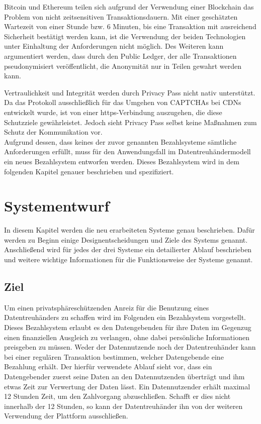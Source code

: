 \documentclass[
	fontsize=12pt,
	headings=small,
	parskip=half,           %
	bibliography=totoc,
	numbers=noenddot,       %
	open=any,               %
]{scrreprt}
\begin{document}
Bitcoin und Ethereum teilen sich aufgrund der Verwendung einer Blockchain das Problem von nicht zeitsensitiven Transaktionsdauern. Mit einer geschätzten Wartezeit von einer Stunde bzw. 6 Minuten, bis eine Transaktion mit ausreichend Sicherheit bestätigt werden kann, ist die Verwendung der beiden Technologien unter Einhaltung der Anforderungen nicht möglich. Des Weiteren kann argumentiert werden, dass durch den Public Ledger, der alle Transaktionen pseudonymisiert veröffentlicht, die Anonymität nur in Teilen gewahrt werden kann. 

Vertraulichkeit und Integrität werden durch Privacy Pass nicht nativ unterstützt. Da das Protokoll ausschließlich für das Umgehen von CAPTCHAs bei CDNs entwickelt wurde, ist von einer https-Verbindung auszugehen, die diese Schutzziele gewährleistet. Jedoch sieht Privacy Pass selbst keine Maßnahmen zum Schutz der Kommunikation vor.\\

Aufgrund dessen, dass keines der zuvor genannten Bezahlsysteme sämtliche Anforderungen erfüllt, muss für den Anwendungsfall im Datentreuhändermodell ein neues Bezahlsystem entworfen werden. Dieses Bezahlsystem wird in dem folgenden Kapitel genauer beschrieben und spezifiziert. 





\chapter{Systementwurf}
\label{chap:systems}

In diesem Kapitel werden die neu erarbeiteten Systeme genau beschrieben. Dafür werden zu Beginn einige Designentscheidungen und Ziele des Systems genannt. Anschließend wird für jedes der drei Systeme ein detailierter Ablauf beschrieben und weitere wichtige Informationen für die Funktionsweise der Systeme genannt.

\section{Ziel}
\label{sec:mainPart_ziel}
Um einen privatsphäreschützenden Anreiz für die Benutzung eines Datentreuhänders zu schaffen wird im Folgenden ein Bezahlsystem vorgestellt. Dieses Bezahlsystem erlaubt es den Datengebenden für ihre Daten im Gegenzug einen finanziellen Ausgleich zu verlangen, ohne dabei persönliche Informationen preisgeben zu müssen. Weder der Datennutzende noch der Datentreuhänder kann bei einer regulären Transaktion bestimmen, welcher Datengebende eine Bezahlung erhält. Der hierfür verwendete Ablauf sieht vor, dass ein Datengebender zuerst seine Daten an den Datennutzenden überträgt und ihm etwas Zeit zur Verwertung der Daten lässt. Ein Datennutzender erhält maximal 12 Stunden Zeit, um den Zahlvorgang abzuschließen. Schafft er dies nicht innerhalb der 12 Stunden, so kann der Datentreuhänder ihn von der weiteren Verwendung der Plattform ausschließen. 
\end{document}
